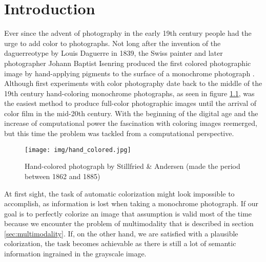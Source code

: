 \chapter{Introduction}

\begin{comment}
    The introduction to the thesis

    Colorization definition

    Topics to cover:
        What is image colorization
        Why is it useful
        What can it be used for
        Description of the task

        Not sure about previous work, if there is enough text, it might be its own chapter
\end{comment}

Ever since the advent of photography in the early 19th century people had
the urge to add color to photographs. Not long after the invention of the 
daguerreotype by Louis Daguerre in 1839, the Swiss painter and later photographer 
Johann Baptist Isenring produced the first colored photographic image by 
hand-applying pigments to the surface of a monochrome photograph \citep{henisch1996photograph}. 
Although first experiments with color photography date back to the middle of the 19th 
century hand-coloring monochrome photographs, as seen in figure \ref{fig:hand_colored}, 
was the easiest method to produce full-color photographic images until the arrival 
of color film in the mid-20th century. With the beginning of the digital age and 
the increase of computational power the fascination with coloring images reemerged, 
but this time the problem was tackled from a computational perspective.

\begin{figure}[H]
    \centering
    \texttt{[image: img/hand\_colored.jpg]}
    \caption{Hand-colored photograph by Stillfried \& Andersen (made the period between 1862 and 1885)}
    \label{fig:hand_colored}
\end{figure}

At first sight, the task of automatic colorization might look impossible to accomplish, 
as information is lost when taking a monochrome photograph. If our goal is to 
perfectly colorize an image that assumption is valid most of the time because we 
encounter the problem of multimodality that is described in section 
\ref{sec:multimodality}. If, on the other hand, we are satisfied with a plausible 
colorization, the task becomes achievable as there is still a lot of semantic 
information ingrained in the grayscale image. 

